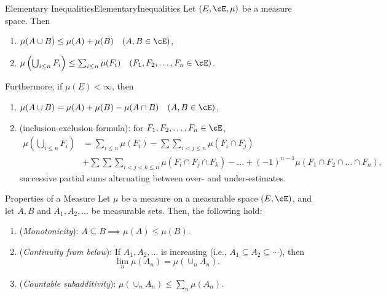 \begin{lem}{Elementary Inequalities}{ElementaryInequalities}
	Let $(E, \cE, \mu)$ be a measure space. Then
	\begin{enumerate}[label=(\alph*)]
		\item $\mu(A \cup B) \le \mu(A) + \mu(B) \quad (A, B \in \cE)$,
		\item $\mu\left(\bigcup_{i \le n} F_i\right) \le \sum_{i \le n} \mu(F_i) \quad (F_1, F_2, \dots, F_n \in \cE)$.
	\end{enumerate}
	Furthermore, if $\mu(E) < \infty$, then
	\begin{enumerate}[label=(\alph*), resume]
		\item $\mu(A \cup B) = \mu(A) + \mu(B) - \mu(A \cap B) \quad (A, B \in \cE)$,
		\item (inclusion-exclusion formula): for $F_1, F_2, \dots, F_n \in \cE$,
		      \begin{align*}
			      \mu\left(\bigcup_{i \le n} F_i\right) & = \sum_{i \le n} \mu(F_i) - \sum \sum_{i < j \le n} \mu(F_i \cap F_j)                                                     \\
			                                            & + \sum \sum \sum_{i < j < k \le n} \mu(F_i \cap F_j \cap F_k) - \dots + (-1)^{n-1} \mu(F_1 \cap F_2 \cap \dots \cap F_n),
		      \end{align*}
		      successive partial sums alternating between over- and under-estimates.
	\end{enumerate}
\end{lem}

\begin{prop}{Properties of a Measure}{}
	Let $\mu$ be a measure on a measurable space $(E, \cE)$, and let $A, B$ and $A_1, A_2, \dots$ be measurable sets. Then, the following hold:
	\begin{enumerate}
		\item (\textit{Monotonicity}): $A \subseteq B \implies \mu(A) \le \mu(B)$.
		\item (\textit{Continuity from below}): If $A_1, A_2, \dots$ is increasing (i.e., $A_1 \subseteq A_2 \subseteq \cdots$), then
		      \begin{equation*}
			      \lim_n \mu(A_n) = \mu(\cup_n A_n).
		      \end{equation*}
		\item (\textit{Countable subadditivity}): $\mu(\cup_n A_n) \le \sum_n \mu(A_n)$.
	\end{enumerate}
\end{prop}

